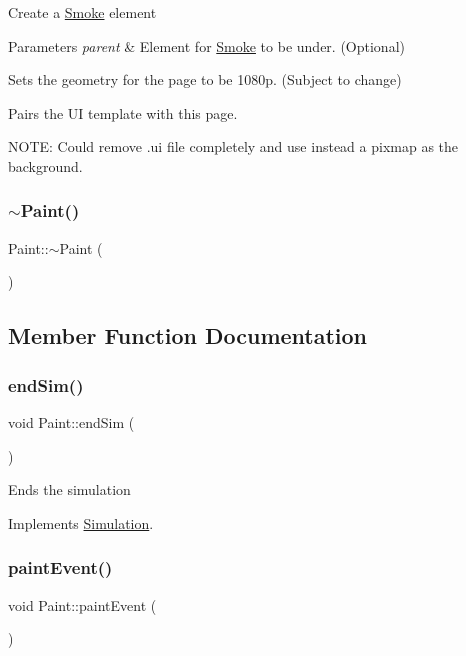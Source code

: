 Create a \mbox{\hyperlink{classSmoke}{Smoke}} element 
\begin{DoxyParams}{Parameters}
{\em parent} & Element for \mbox{\hyperlink{classSmoke}{Smoke}} to be under. (Optional)\\
\hline
\end{DoxyParams}
Sets the geometry for the page to be 1080p. (Subject to change)

Pairs the UI template with this page.

N\+O\+TE\+: Could remove .ui file completely and use instead a pixmap as the background. \mbox{\label{classPaint_ad9e9b7084b28e84887c70d0e4540ddb8}} 
\subsubsection{\texorpdfstring{$\sim$Paint()}{~Paint()}}
{\footnotesize\ttfamily Paint\+::$\sim$\+Paint (\begin{DoxyParamCaption}{ }\end{DoxyParamCaption})}



\subsection{Member Function Documentation}
\mbox{\label{classPaint_a0624eaeb1d076ab01278b27026aba249}} 
\subsubsection{\texorpdfstring{endSim()}{endSim()}}
{\footnotesize\ttfamily void Paint\+::end\+Sim (\begin{DoxyParamCaption}{ }\end{DoxyParamCaption})\hspace{0.3cm}{\ttfamily [virtual]}}

Ends the simulation 

Implements \mbox{\hyperlink{classSimulation_ab496d124202f55e741db7db9a304a7ee}{Simulation}}.

\mbox{\label{classPaint_a93538df552b492f35b5349c9c546707f}} 
\subsubsection{\texorpdfstring{paintEvent()}{paintEvent()}}
{\footnotesize\ttfamily void Paint\+::paint\+Event (\begin{DoxyParamCaption}\item[{Q\+Paint\+Event $\ast$}]{ }\end{DoxyParamCaption})}


